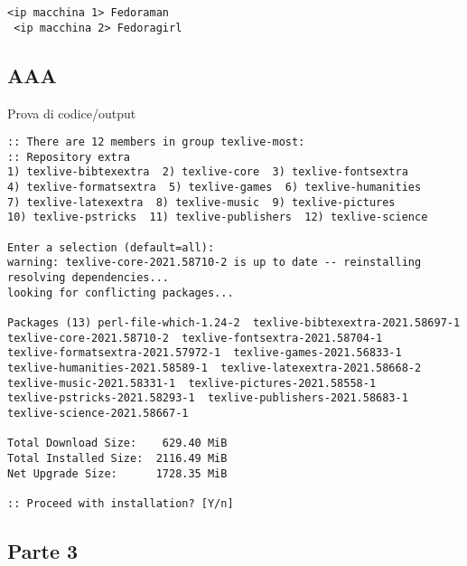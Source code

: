 \begin{lstlisting}[style=cmd]
 <ip macchina 1> Fedoraman
 <ip macchina 2> Fedoragirl
\end{lstlisting}

\subsection{AAA}

Prova di codice/output

\begin{lstlisting}[style=cmd]
:: There are 12 members in group texlive-most:
:: Repository extra
1) texlive-bibtexextra  2) texlive-core  3) texlive-fontsextra
4) texlive-formatsextra  5) texlive-games  6) texlive-humanities
7) texlive-latexextra  8) texlive-music  9) texlive-pictures
10) texlive-pstricks  11) texlive-publishers  12) texlive-science

Enter a selection (default=all): 
warning: texlive-core-2021.58710-2 is up to date -- reinstalling
resolving dependencies...
looking for conflicting packages...

Packages (13) perl-file-which-1.24-2  texlive-bibtexextra-2021.58697-1
texlive-core-2021.58710-2  texlive-fontsextra-2021.58704-1
texlive-formatsextra-2021.57972-1  texlive-games-2021.56833-1
texlive-humanities-2021.58589-1  texlive-latexextra-2021.58668-2
texlive-music-2021.58331-1  texlive-pictures-2021.58558-1
texlive-pstricks-2021.58293-1  texlive-publishers-2021.58683-1
texlive-science-2021.58667-1

Total Download Size:    629.40 MiB
Total Installed Size:  2116.49 MiB
Net Upgrade Size:      1728.35 MiB

:: Proceed with installation? [Y/n] 

\end{lstlisting}

\subsection{Parte 3}

